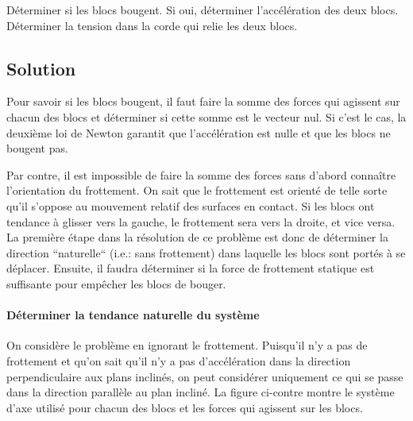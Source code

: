 Déterminer si les blocs bougent.  Si oui, déterminer l'accélération des deux
blocs.  Déterminer la tension dans la corde qui relie les deux blocs.

\subsection{Solution}

Pour savoir si les blocs bougent, il faut faire la somme des forces qui
agissent sur chacun des blocs et déterminer si cette somme est le vecteur nul.
Si c'est le cas, la deuxième loi de Newton garantit que l'accélération est
nulle et que les blocs ne bougent pas.

Par contre, il est impossible de faire la somme des forces sans d'abord
connaître l'orientation du frottement.  On sait que le frottement est orienté
de telle sorte qu'il s'oppose au mouvement relatif des surfaces en contact.  Si
les blocs ont tendance à glisser vers la gauche, le frottement sera vers la
droite, et vice versa.  La première étape dans la résolution de ce problème est
donc de déterminer la direction ``naturelle`` (i.e.: sans frottement) dans
laquelle les blocs sont portés à se déplacer.  Ensuite, il faudra déterminer si
la force de frottement statique est suffisante pour empêcher les blocs de
bouger.

\paragraph{Déterminer la tendance naturelle du système}

On considère le problème en ignorant le frottement.  Puisqu'il n'y a pas de
frottement et qu'on sait qu'il n'y a pas d'accélération dans la direction
perpendiculaire aux plans inclinés, on peut considérer uniquement ce qui se
passe dans la direction parallèle au plan incliné.  La figure ci-contre montre
le système d'axe utilisé pour chacun des blocs et les forces qui agissent sur
les blocs.

